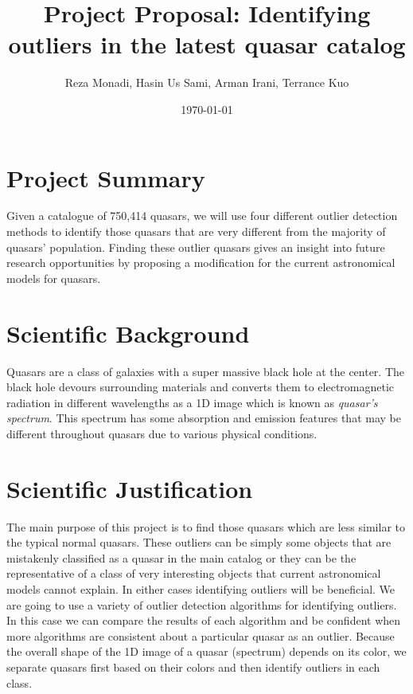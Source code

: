 \documentclass[usenatbib,a4paper,fleqn]{article}
\title{Project Proposal: Identifying outliers in the latest quasar catalog}
\author{Reza Monadi, Hasin Us Sami,
Arman Irani, Terrance Kuo}
\date{\today}
\begin{document}
\maketitle


\section*{Project Summary}
Given a catalogue of 750,414 quasars, we will use four different outlier detection methods to identify those quasars 
that are very different from the majority of quasars' population. Finding these outlier quasars gives an
 insight into future research opportunities by proposing a modification for the current astronomical models for quasars. 
\section*{ Scientific Background }

Quasars are a class of galaxies with a super massive black hole at the center. The black hole devours surrounding materials and converts them to electromagnetic radiation 
in different wavelengths as a 1D image which is known as  \emph{quasar's spectrum}. This spectrum has some absorption and emission  
features that may be different throughout quasars due to various  physical conditions.

\section*{ Scientific Justification}
The main purpose of this project is to find those quasars which are less similar to the typical normal quasars. 
These outliers can be simply some objects that are mistakenly classified as a quasar in the main catalog or they can be the
representative of a class of very interesting objects that current astronomical models cannot explain. 
In either cases identifying outliers will be beneficial. We are going to use a variety of outlier detection 
algorithms for identifying outliers. In this case we can compare the results of each algorithm and be  confident 
when more algorithms are consistent about a particular quasar as an outlier. 
Because the overall shape of the 1D image of a quasar (spectrum) depends on its color, we separate quasars 
first based on their colors and then identify outliers in each class.
\end{document}
